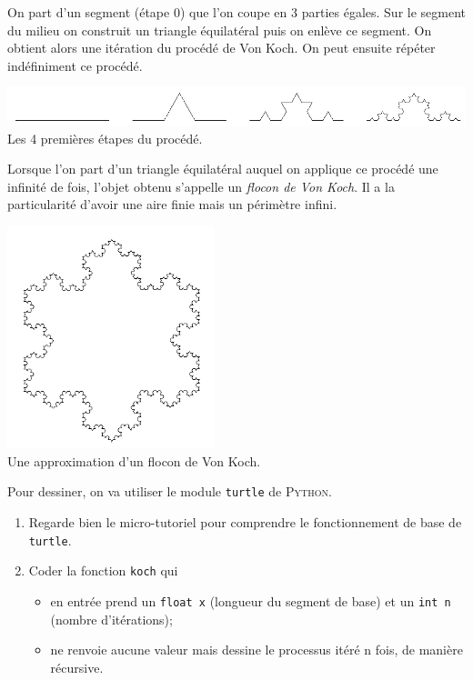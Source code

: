 \documentclass[10pt,firamath,cours]{nsi}
\begin{document}
\begin{exercice}
	On part d'un segment (étape 0) que l'on coupe en 3 parties égales. Sur le segment du milieu on construit un triangle équilatéral puis on enlève ce segment. On obtient alors une itération du procédé de Von Koch. On peut ensuite répéter indéfiniment ce procédé.
	\begin{center}
		\includegraphics[width=\linewidth]{img/koch}\\
		\scriptsize Les 4 premières étapes du procédé.
	\end{center}
	Lorsque l'on part d'un triangle équilatéral auquel on applique ce procédé une infinité de fois, l'objet obtenu s'appelle un \textit{flocon de Von Koch}. Il a la particularité d'avoir une aire finie mais un périmètre infini.
	\begin{center}
		\includegraphics[width=6cm]{img/flocon}\\
		\scriptsize Une approximation d'un flocon de Von Koch.
	\end{center}
	Pour dessiner, on va utiliser le module \texttt{turtle} de \textsc{Python}.
	\begin{enumerate}
		\item  Regarde bien le micro-tutoriel pour comprendre le fonctionnement de base de \texttt{turtle}.
		\item 	Coder la fonction \texttt{koch} qui
		      \begin{itemize}
			      \item 	en entrée prend un \texttt{float x} (longueur du segment de base) et un \texttt{int n} (nombre d'itérations);
			      \item 	ne renvoie aucune valeur mais dessine le processus itéré n fois, de manière récursive.
		      \end{itemize}
	\end{enumerate}
\end{exercice}
\end{document}
